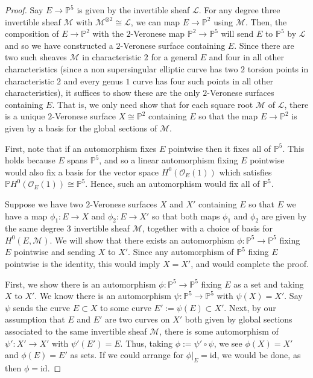 \documentclass[reqno, 11pt]{amsart}
\theoremstyle{definition}
\theoremstyle{remark}
\numberwithin{equation}{section}
\numberwithin{thm}{section}
\numberwithin{prop}{section}
\numberwithin{lem}{section}
\numberwithin{cor}{section}
\numberwithin{conj}{section}
\numberwithin{defn}{section}
\theoremstyle{plain}
\theoremstyle{definition}
\newcommand\bp{{\mathbb P}}
\newcommand\scl{\mathscr L}
\newcommand\scm{\mathscr M}
\newcommand\sco{\mathscr O}
\newcommand \ra{\rightarrow}
\newcommand{\id}{\mathrm{id}}
\begin{document}
\begin{proof}
  Say $E \ra \bp^5$ is given by the invertible sheaf $\scl$. For any degree three invertible sheaf
$\scm$ with $\scm^{\otimes 2} \cong \scl$, we can map $E \ra \bp^2$ using $\scm$. Then, the composition of
$E \ra \bp^2$ with the $2$-Veronese map $\bp^2 \ra \bp^5$ will send $E$ to $\bp^5$ by $\scl$ and so we have
constructed a $2$-Veronese surface containing $E$. Since there are two such sheaves $\scm$
in characteristic $2$ for a general $E$ and four in all other characteristics (since a non supersingular elliptic curve has
two $2$ torsion points in characteristic $2$ and every genus $1$ curve has four such points in all other characteristics), it suffices to show these are the only 
$2$-Veronese surfaces containing $E$.
That is, we only need show that for each square root $\scm$ of $\scl$, there is a unique $2$-Veronese surface
$X \cong \bp^2$ containing $E$ so that the map $E \ra \bp^2$ is given by a basis for the global sections of $\scm$.
 
  First, note that if an automorphism fixes $E$ pointwise then it fixes all of $\bp^5$.
  This holds because $E$ spans $\bp^5$, and so a linear automorphism fixing $E$ pointwise would
also fix a basis for the vector space $H^0(\sco_E(1))$ which satisfies $\bp H^0(\sco_E(1)) \cong \bp^5$. Hence, such an automorphism would 
fix all of $\bp^5$.

 Suppose we have two $2$-Veronese surfaces $X$ and $X'$ containing
  $E$ so that $E$ 
  we have a map $\phi_1: E \ra X$ and $\phi_2 : E \ra X'$ so that
  both maps $\phi_1$ and $\phi_2$ are given by the same degree $3$ invertible
sheaf $\scm$, together with a choice of basis for $H^0(E, \scm)$.
  We will show that there exists an automorphism $\phi:\bp^5 \ra \bp^5$
  fixing $E$ pointwise and sending $X$ to $X'$. Since any automorphism of $\bp^5$
  fixing $E$ pointwise is the identity, this would imply $X = X'$, and would complete the proof.
 
  First, we show there is an automorphism $\phi: \bp^5 \ra \bp^5$
  fixing $E$ as a set and taking
  $X$ to $X'$.
  We know there is an automorphism $\psi:\bp^5 \ra \bp^5$ with $\psi(X) = X'$.
  Say $\psi$ sends the curve $E \subset X$
  to some curve $E' := \psi(E) \subset X'$.
  Next, by our assumption that $E$ and $E'$ are two curves on $X'$ both given by
  global sections associated to the same invertible sheaf $\scm$,
  there is some automorphism of $\psi': X' \ra X'$ with $\psi'(E') = E$.
  Thus, taking $\phi := \psi' \circ \psi$, we see
  $\phi(X) = X'$ and $\phi(E) = E'$ as sets.
  If we could arrange for $\phi|_E = \id$, we would be done, as then $\phi = \id$.


\end{proof}
\end{document}
